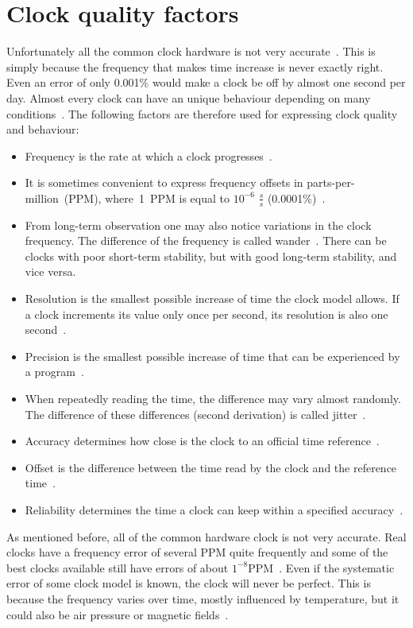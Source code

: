 \section{Clock quality factors}
Unfortunately all the common clock hardware is not very accurate~\cite{ntp-faq}.
This is simply because the frequency that makes time increase is never exactly right.
Even an error of only 0.001\% would make a clock be off by almost one second per day.
Almost every clock can have an unique behaviour depending on many conditions~\cite{ntp-faq}.
The following factors are therefore used for expressing clock quality and behaviour:
\begin{itemize}
\item
Frequency is the rate at which a clock progresses~\cite{thesis-sync}.
\item
It is sometimes convenient
to express frequency offsets in parts-per-million~(PPM), where~1~PPM
is equal to $10^{-6}$ $\frac{s}{s}$ (0.0001\%)~\cite{rfc5905}.
\item
From long-term observation one may also notice variations in the clock frequency.
The difference of the frequency is called wander~\cite{ntp-faq}.
There can be clocks with poor short-term stability, but with good long-term stability, and vice versa.
\item
Resolution is the smallest possible increase of time the clock model allows.
If a clock increments its value only once per second, its resolution is also one second~\cite{ntp-faq}.
\item
Precision is the smallest possible increase of time that can be experienced
by a program~\cite{ntp-faq}.
\item
When repeatedly reading the time, the difference may vary almost randomly.
The difference of these differences (second derivation) is called jitter~\cite{ntp-faq}.
\item
Accuracy determines how close is the clock to an official time reference~\cite{ntp-faq}.
\item
Offset is the difference between the time read by the clock and the reference time~\cite{thesis-sync}.
\item
Reliability determines the time a clock can keep within a specified accuracy~\cite{ntp-faq}.
\end{itemize}

As mentioned before, all of the common hardware clock is not very accurate.
Real clocks have a frequency error of several PPM quite frequently
and some of the best clocks available still have errors of about $1^{-8}$PPM~\cite{ntp-faq}.
Even if the systematic error of some clock model is known, the clock will never be perfect.
This is because the frequency varies over time, mostly influenced by temperature,
but it could also be air pressure or magnetic fields~\cite{ntp-faq}.

